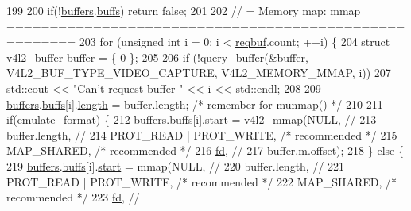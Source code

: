 \begin{DoxyCode}
199 
200     \textcolor{keywordflow}{if}(!\hyperlink{classv4lcap_a046084072d2279bb204ed93cd2692700}{buffers}.\hyperlink{structv4lcap_1_1buffer__holder_afa53426fad11e19f7d615f564c979495}{buffs}) \textcolor{keywordflow}{return} \textcolor{keyword}{false};
201 
202     \textcolor{comment}{// = Memory map: mmap ======================================================}
203     \textcolor{keywordflow}{for} (\textcolor{keywordtype}{unsigned} \textcolor{keywordtype}{int} i = 0; i < \hyperlink{classv4lcap_a4b98d5a7e7859a8e234d54649ea9251e}{reqbuf}.count; ++i) \{
204         \textcolor{keyword}{struct }v4l2\_buffer buffer = \{ 0 \};
205 
206         \textcolor{keywordflow}{if} (!\hyperlink{classv4lcap_a238573a18b367ebc812a49f4f1917012}{query\_buffer}(&buffer, V4L2\_BUF\_TYPE\_VIDEO\_CAPTURE, V4L2\_MEMORY\_MMAP, i))
207             std::cout << \textcolor{stringliteral}{"Can't request buffer "} << i << std::endl;
208 
209         \hyperlink{classv4lcap_a046084072d2279bb204ed93cd2692700}{buffers}.\hyperlink{structv4lcap_1_1buffer__holder_afa53426fad11e19f7d615f564c979495}{buffs}[i].\hyperlink{structv4lcap_1_1buffer_a63df371d2260a5daf5e948cf4ccef703}{length} = buffer.length; \textcolor{comment}{/* remember for munmap() */}
210 
211         \textcolor{keywordflow}{if}(\hyperlink{classv4lcap_a21b4c152f56ecc309a490cb8ab4ce117}{emulate\_format}) \{
212             \hyperlink{classv4lcap_a046084072d2279bb204ed93cd2692700}{buffers}.\hyperlink{structv4lcap_1_1buffer__holder_afa53426fad11e19f7d615f564c979495}{buffs}[i].\hyperlink{structv4lcap_1_1buffer_ae4fca9eb7724f4a93ee14537fb34597e}{start} = v4l2\_mmap(NULL, \textcolor{comment}{//}
213                     buffer.length, \textcolor{comment}{//}
214                     PROT\_READ | PROT\_WRITE, \textcolor{comment}{/* recommended */}
215                     MAP\_SHARED, \textcolor{comment}{/* recommended */}
216                     \hyperlink{classv4lcap_a38109593bde997dad13b3a461569573d}{fd}, \textcolor{comment}{//}
217                     buffer.m.offset);
218         \} \textcolor{keywordflow}{else} \{
219             \hyperlink{classv4lcap_a046084072d2279bb204ed93cd2692700}{buffers}.\hyperlink{structv4lcap_1_1buffer__holder_afa53426fad11e19f7d615f564c979495}{buffs}[i].\hyperlink{structv4lcap_1_1buffer_ae4fca9eb7724f4a93ee14537fb34597e}{start} = mmap(NULL, \textcolor{comment}{//}
220                     buffer.length, \textcolor{comment}{//}
221                     PROT\_READ | PROT\_WRITE, \textcolor{comment}{/* recommended */}
222                     MAP\_SHARED, \textcolor{comment}{/* recommended */}
223                     \hyperlink{classv4lcap_a38109593bde997dad13b3a461569573d}{fd}, \textcolor{comment}{//}

\end{DoxyCode}
